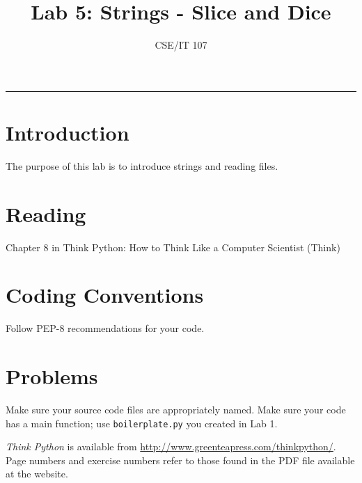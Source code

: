 \documentclass[12pt]{article}
\title{Lab 5: Strings - Slice and Dice}
\author{CSE/IT 107}
\date{}
\begin{document}
\maketitle


\hrule
\section*{Introduction}

The purpose of this lab is to introduce strings and reading files.

\section*{Reading}

Chapter 8 in Think Python: How to Think Like a Computer Scientist (Think)

\section*{Coding Conventions}

Follow PEP-8 recommendations for your code. 

\section*{Problems}

    
  Make sure your source code files are appropriately named. Make sure your code has a main function; use \texttt{boilerplate.py} you created in Lab 1.

\emph{Think Python} is available from \url{http://www.greenteapress.com/thinkpython/}. Page numbers and exercise numbers refer to those found in the PDF file available at the website.
\end{document}
